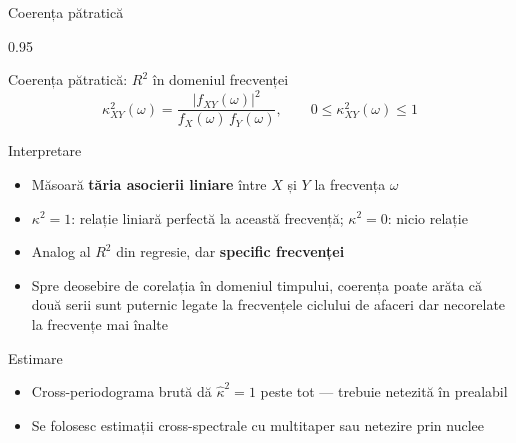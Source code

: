 \documentclass[9pt, aspectratio=169, t]{beamer}
\begin{document}
\begin{frame}{Coerența pătratică}
    \begin{cminipage}{0.95\textwidth}
    \vspace{-3mm}
    \begin{block}{Coerența pătratică: $R^2$ în domeniul frecvenței}
        {\small
        \[
            \kappa^2_{XY}(\omega) = \frac{|f_{XY}(\omega)|^2}{f_X(\omega)\,f_Y(\omega)}, \qquad 0 \leq \kappa^2_{XY}(\omega) \leq 1
        \]
        }
    \end{block}
    \vspace{-2mm}
    \begin{exampleblock}{Interpretare}
        \begin{itemize}\setlength{\itemsep}{-2pt}
            \item Măsoară \textbf{tăria asocierii liniare} între $X$ și $Y$ la frecvența $\omega$
            \item $\kappa^2 = 1$: relație liniară perfectă la această frecvență; $\kappa^2 = 0$: nicio relație
            \item Analog al $R^2$ din regresie, dar \textbf{specific frecvenței}
            \item Spre deosebire de corelația în domeniul timpului, coerența poate arăta că două serii sunt puternic legate la frecvențele ciclului de afaceri dar necorelate la frecvențe mai înalte
        \end{itemize}
    \end{exampleblock}
    \vspace{-2mm}
    \begin{alertblock}{Estimare}
        \begin{itemize}\setlength{\itemsep}{-2pt}
            \item Cross-periodograma brută dă $\hat{\kappa}^2 = 1$ peste tot --- trebuie netezită în prealabil
            \item Se folosesc estimații cross-spectrale cu multitaper sau netezire prin nuclee
        \end{itemize}
    \end{alertblock}
    \end{cminipage}
\end{frame}
\end{document}
